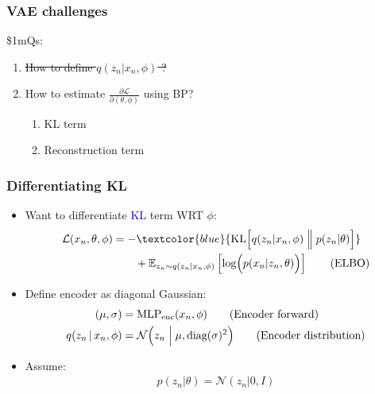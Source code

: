 \documentclass[xcolor=table,dvipsnames]{beamer}
\begin{document}
\begin{frame}
    \frametitle{VAE challenges}
    \$1mQs:
    \begin{enumerate}
        \setlength{\itemsep}{2em}
        \vspace{2em}
        \item \sout{How to define $q(z_n \vert x_n, \phi)$ ?}
        \item How to estimate $\frac{\partial\mathcal{L}}{\partial(\theta,\phi)}$ using BP?
        \begin{enumerate}
            \setlength{\itemsep}{2em}
            \vspace{2em}
            \item KL term
            \item Reconstruction term
        \end{enumerate}
    \end{enumerate}
\end{frame}

\begin{frame}[t]
    \frametitle{Differentiating KL}
    \begin{itemize}
        \item Want to differentiate \textcolor{blue}{KL} term WRT $\phi$:
        \begin{align*}
            \mathcal{L}(x_n, \theta, \phi) &= -\textcolor{blue}{\text{KL}\Bigl[q(z_n \vert x_n, \phi) \Bigm\Vert p(z_n \vert \theta)\Bigr]} \\
            &\qquad + \mathbb{E}_{z_n\sim q(z_n \vert x_n, \phi)}\left[ \log \Bigl(p(x_n \vert z_n, \theta)\Bigr) \right] \tag{ELBO}
        \end{align*}
        \item Define encoder as diagonal Gaussian:
        \begin{align*}
            (\mu, \sigma) &= \text{MLP}_\text{enc}(x_n, \phi) \tag{Encoder forward} \\
            q(z_n \,\vert\, x_n, \phi) &= \mathcal{N}\Bigl( z_n \Bigm\vert \mu, \text{diag}(\sigma)^2 \Bigr) \tag{Encoder distribution}
        \end{align*}
        \item Assume:
        \begin{align*}
            p(z_n\vert\theta) = \mathcal{N}(z_n\vert 0, I) \tag{Prior distribution}
        \end{align*}
    \end{itemize}
\end{frame}
\end{document}
